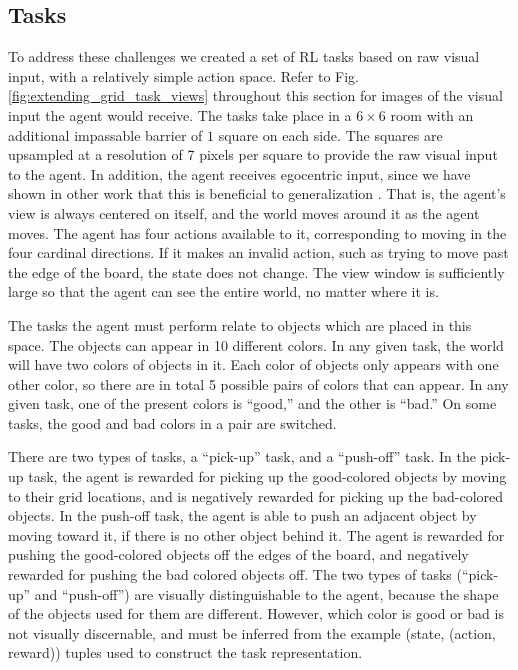 \subsection{Tasks}
To address these challenges we created a set of RL tasks based on raw visual input, with a relatively simple action space. Refer to Fig. \ref{fig:extending_grid_task_views} throughout this section for images of the visual input the agent would receive. The tasks take place in a \(6 \times 6\) room with an additional impassable barrier of \(1\) square on each side. The squares are upsampled at a resolution of 7 pixels per square to provide the raw visual input to the agent. In addition, the agent receives egocentric input, since we have shown in other work that this is beneficial to generalization \citep{Hill2019a}. That is, the agent's view is always centered on itself, and the world moves around it as the agent moves. The agent has four actions available to it, corresponding to moving in the four cardinal directions. If it makes an invalid action, such as trying to move past the edge of the board, the state does not change. The view window is sufficiently large so that the agent can see the entire world, no matter where it is.\par 
The tasks the agent must perform relate to objects which are placed in this space. The objects can appear in 10 different colors. In any given task, the world will have two colors of objects in it. Each color of objects only appears with one other color, so there are in total 5 possible pairs of colors that can appear. In any given task, one of the present colors is ``good,'' and the other is ``bad.'' On some tasks, the good and bad colors in a pair are switched.\par
There are two types of tasks, a ``pick-up'' task, and a ``push-off'' task. In the pick-up task, the agent is rewarded for picking up the good-colored objects by moving to their grid locations, and is negatively rewarded for picking up the bad-colored objects. In the push-off task, the agent is able to push an adjacent object by moving toward it, if there is no other object behind it. The agent is rewarded for pushing the good-colored objects off the edges of the board, and negatively rewarded for pushing the bad colored objects off. The two types of tasks (``pick-up'' and ``push-off'') are visually distinguishable to the agent, because the shape of the objects used for them are different. However, which color is good or bad is not visually discernable, and must be inferred from the example (state, (action, reward)) tuples used to construct the task representation.\par 
